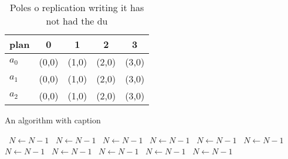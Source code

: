 \documentclass[a4paper]{article}
\begin{document}
\begin{table}
\begin{adjustbox}{width=0.6\columnwidth}
\begin{tabular}{|l|l|l|l|l|}
\hline
\textbf{plan} & \multicolumn{1}{c|}{\textbf{0}} & \multicolumn{1}{c|}{\textbf{1}} & \multicolumn{1}{c|}{\textbf{2}} & \multicolumn{1}{c|}{\textbf{3}} \\ \hline
\textbf{$a_0$}  & (0,0) & (1,0) & (2,0) & (3,0) \\ \hline
\textbf{$a_1$}  & (0,0) & (1,0) & (2,0) & (3,0) \\ \hline
\textbf{$a_2$}  & (0,0) & (1,0) & (2,0) & (3,0) \\ \hline
\end{tabular}
\end{adjustbox}
\caption{Poles o replication writing it has not had the du
}
\end{table}

\begin{algorithm}
\caption{An algorithm with caption}
\begin{algorithmic}
\    \State $N \gets N - 1$
\    \State $N \gets N - 1$
\    \State $N \gets N - 1$
\    \State $N \gets N - 1$
\    \State $N \gets N - 1$
\    \State $N \gets N - 1$
\    \State $N \gets N - 1$
\    \State $N \gets N - 1$
\    \State $N \gets N - 1$
\    \State $N \gets N - 1$
\    \State $N \gets N - 1$
\EndWhile
\end{algorithmic}
\end{algorithm}
\end{document}
